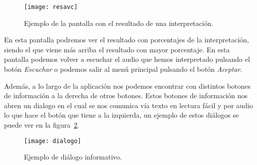 \begin{figure}[htp]
	\centering
	\texttt{[image: resavc]}
	\caption{Ejemplo de la pantalla con el resultado de una interpretación.}
	\label{fig:resavc}
\end{figure}

En esta pantalla podremos ver el resultado con porcentajes de la interpretación, siendo el que viene más arriba el resultado con mayor porcentaje. En esta pantalla podemos volver a escuchar el audio que hemos interpretado pulsando el botón \textit{Escuchar} o podemos salir al menú principal pulsando el botón \textit{Aceptar}.

Además, a lo largo de la aplicación nos podemos encontrar con distintos botones de información a la derecha de otros botones. Estos botones de información nos abren un dialogo en el cual se nos comunica vía texto en lectura fácil y por audio lo que hace el botón que tiene a la izquierda, un ejemplo de estos diálogos se puede ver en la figura~\ref{fig:diaavc}.

\begin{figure}[htp]
	\centering
	\texttt{[image: dialogo]}
	\caption{Ejemplo de diálogo informativo.}
	\label{fig:diaavc}
\end{figure}